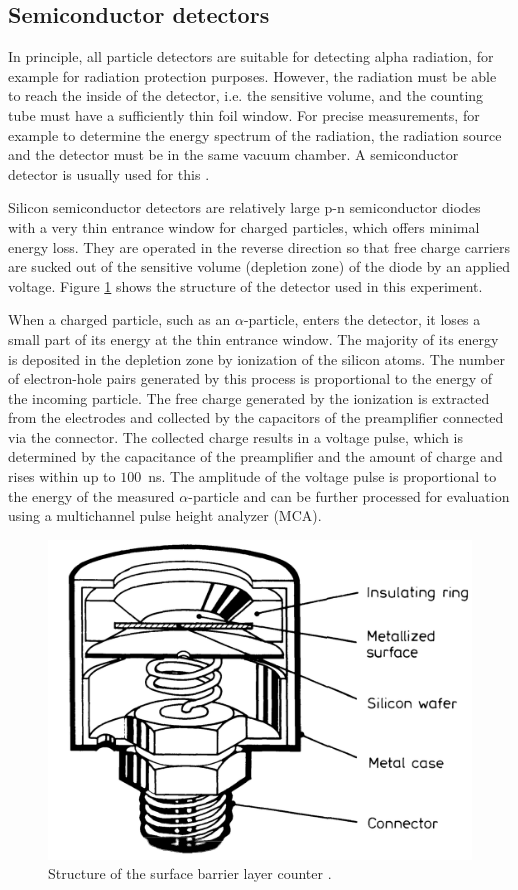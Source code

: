 \subsection{Semiconductor detectors}
In principle, all particle detectors are suitable for detecting alpha radiation, for example for radiation protection purposes. However, the radiation must be able to reach the inside of the detector, i.e. the sensitive volume, and the counting tube must have a sufficiently thin foil window. For precise measurements, for example to determine the energy spectrum of the radiation, the radiation source and the detector must be in the same vacuum chamber. A semiconductor detector is usually used for this \cite{dewiki:240085809}.

Silicon semiconductor detectors are relatively large p-n semiconductor diodes with a very thin entrance window for charged particles, which offers minimal energy loss. They are operated in the reverse direction so that free charge carriers are sucked out of the sensitive volume (depletion zone) of the diode by an applied voltage. Figure \ref{fig:surfacebarrier} shows the structure of the detector used in this experiment. 

When a charged particle, such as an $\alpha$-particle, enters the detector, it loses a small part of its energy at the thin entrance window. The majority of its energy is deposited in the depletion zone by ionization of the silicon atoms. The number of electron-hole pairs generated by this process is proportional to the energy of the incoming particle. The free charge generated by the ionization is extracted from the electrodes and collected by the capacitors of the preamplifier connected via the connector. The collected charge results in a voltage pulse, which is determined by the capacitance of the preamplifier and the amount of charge and rises within up to $100$~ns. The amplitude of the voltage pulse is proportional to the energy of the measured $\alpha$-particle and can be further processed for evaluation using a multichannel pulse height analyzer (MCA).

%
\begin{figure}[h]
	\centering
	\includegraphics[width=0.7\linewidth]{img/surface.png}
	\caption{Structure of the surface barrier layer counter \cite{leo}.}
	\label{fig:surfacebarrier}
\end{figure}

